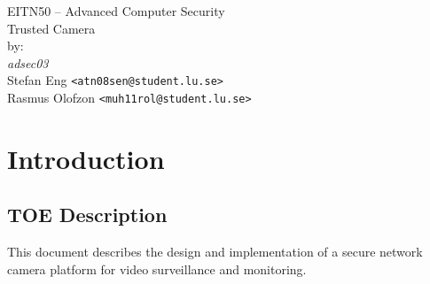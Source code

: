 \documentclass[10pt]{article}
\begin{document}

  \thispagestyle{empty}
  \vspace*{3cm}
  \begin{center}
    \huge{EITN50 -- Advanced Computer Security} \\
    \vspace{0.3cm}
    \LARGE{Trusted Camera} \\
    \vspace{1cm}
    \large{by: \\ \vspace{0.2cm}
	\textit{adsec03} \\
        Stefan Eng \texttt{<atn08sen@student.lu.se>} \\
        Rasmus Olofzon \texttt{<muh11rol@student.lu.se>}
        } \\
  \end{center}


  \newpage

  \section{Introduction}



    \subsection{TOE Description}

      This document describes the design and implementation of a secure network
      camera platform for video surveillance and monitoring.
\end{document}
